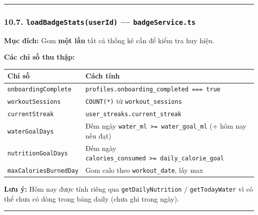 \documentclass[12pt,a4paper]{article}
\newcounter{none}
\begin{document}
\begin{center}\rule{0.5\linewidth}{0.5pt}\end{center}

\subsubsection{\texorpdfstring{10.7. \texttt{loadBadgeStats(userId)} ---
\texttt{badgeService.ts}}{10.7. loadBadgeStats(userId) --- badgeService.ts}}\label{loadbadgestatsuserid-badgeservice.ts}

\textbf{Mục đích:} Gom \textbf{một lần} tất cả thống kê cần để kiểm tra
huy hiệu.

\textbf{Các chỉ số thu thập:}

{\def\LTcaptype{none} %
\begin{longtable}[]{@{}
  >{\raggedright\arraybackslash}p{}
  >{\raggedright\arraybackslash}p{}@{}}
\toprule\noalign{}
\begin{minipage}[b]{\linewidth}\raggedright
Chỉ số
\end{minipage} & \begin{minipage}[b]{\linewidth}\raggedright
Cách tính
\end{minipage} \\
\midrule\noalign{}
\endhead
\bottomrule\noalign{}
\endlastfoot
\texttt{onboardingComplete} &
\texttt{profiles.onboarding\_completed\ ===\ true} \\
\texttt{workoutSessions} & \texttt{COUNT(*)} từ
\texttt{workout\_sessions} \\
\texttt{currentStreak} & \texttt{user\_streaks.current\_streak} \\
\texttt{waterGoalDays} & Đếm ngày
\texttt{water\_ml\ \textgreater{}=\ water\_goal\_ml} (+ hôm nay nếu
đạt) \\
\texttt{nutritionGoalDays} & Đếm ngày
\texttt{calories\_consumed\ \textgreater{}=\ daily\_calorie\_goal} \\
\texttt{maxCaloriesBurnedDay} & Gom calo theo \texttt{workout\_date},
lấy max \\
\end{longtable}
}

\textbf{Lưu ý:} Hôm nay được tính riêng qua \texttt{getDailyNutrition} /
\texttt{getTodayWater} vì có thể chưa có dòng trong bảng daily (chưa ghi
trong ngày).

\begin{center}\rule{0.5\linewidth}{0.5pt}\end{center}
\end{document}
